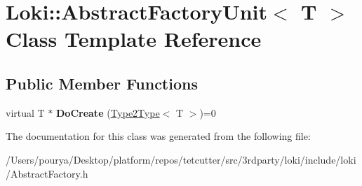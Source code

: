 \hypertarget{classLoki_1_1AbstractFactoryUnit}{}\section{Loki\+:\+:Abstract\+Factory\+Unit$<$ T $>$ Class Template Reference}
\label{classLoki_1_1AbstractFactoryUnit}
\subsection*{Public Member Functions}
\begin{DoxyCompactItemize}
\item 
\hypertarget{classLoki_1_1AbstractFactoryUnit_a0e83f4f5d51b0a24e497ee3849cd65d4}{}virtual T $\ast$ {\bfseries Do\+Create} (\hyperlink{structLoki_1_1Type2Type}{Type2\+Type}$<$ T $>$)=0\label{classLoki_1_1AbstractFactoryUnit_a0e83f4f5d51b0a24e497ee3849cd65d4}

\end{DoxyCompactItemize}


The documentation for this class was generated from the following file\+:\begin{DoxyCompactItemize}
\item 
/\+Users/pourya/\+Desktop/platform/repos/tetcutter/src/3rdparty/loki/include/loki/Abstract\+Factory.\+h\end{DoxyCompactItemize}
